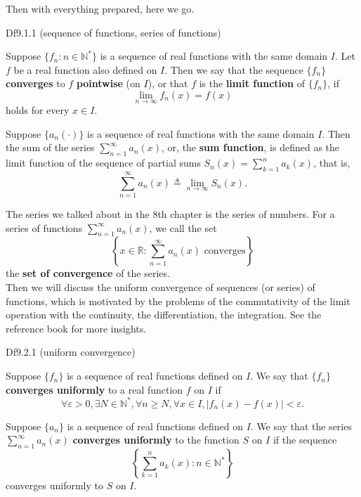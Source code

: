 \documentclass{article}
\begin{document}
Then with everything prepared, here we go. 

\begin{Df}{Df9.1.1 (sequence of functions, series of functions)}
    \begin{compactenum}
        \item Suppose $\{f_n: n\in\mathbb{N}^\ast\}$ is a sequence of real functions with the same domain $I$. Let $f$ be a real function also defined on $I$. Then we say that the sequence $\{f_n\}$ \textbf{converges} to $f$ \textbf{pointwise} (on $I$), or that $f$ is the \textbf{limit function} of $\{f_n\}$, if 
        $$\lim_{n\to\infty} f_n(x) = f(x)$$
        holds for every $x\in I$.
        \item Suppose $\{a_n(\cdot)\}$ is a sequence of real functions with the same domain $I$. Then the sum of the series $\sum_{n=1}^{\infty} a_n(x)$, or, the \textbf{sum function}, is defined as the limit function of the sequence of partial sums $S_n(x) = \sum_{k=1}^{n} a_k(x)$, that is, 
        $$\sum_{n=1}^{\infty} a_n(x) \triangleq \lim_{n\to\infty} S_n(x).$$
    \end{compactenum}
\end{Df}

\begin{Rmk}{}
    The series we talked about in the 8th chapter is the series of numbers. \textcolor{Df}{For a series of functions $\sum_{n=1}^{\infty} a_n(x)$, we call the set
    $$\left\{x\in \mathbb{R}: \sum_{n=1}^{\infty} a_n(x) \text{ converges}\right\}$$
    the \textbf{set of convergence} of the series.} \\
    Then we will discuss the uniform convergence of sequences (or series) of functions, which is motivated by the problems of the commutativity of the limit operation with the continuity, the differentiation, the integration. See the reference book for more insights.
\end{Rmk}

\begin{Df}{Df9.2.1 (uniform convergence)}
    \begin{compactenum}
        \item Suppose $\{f_n\}$ is a sequence of real functions defined on $I$. We say that $\{f_n\}$ \textbf{converges uniformly} to a real function $f$ on $I$ if
        $$ \forall \varepsilon > 0, \exists N\in\mathbb{N}^\ast, \forall n\geq N, \forall x\in I, |f_n(x) - f(x)| < \varepsilon. $$
        \item Suppose $\{a_n\}$ is a sequence of real functions defined on $I$. We say that the series $\sum_{n=1}^{\infty} a_n(x)$ \textbf{converges uniformly} to the function $S$ on $I$ if the sequence 
        $$ \left\{\sum_{k=1}^{n} a_k(x): n\in\mathbb{N}^\ast \right\} $$ 
        converges uniformly to $S$ on $I$.
    \end{compactenum}
\end{Df}
\end{document}
